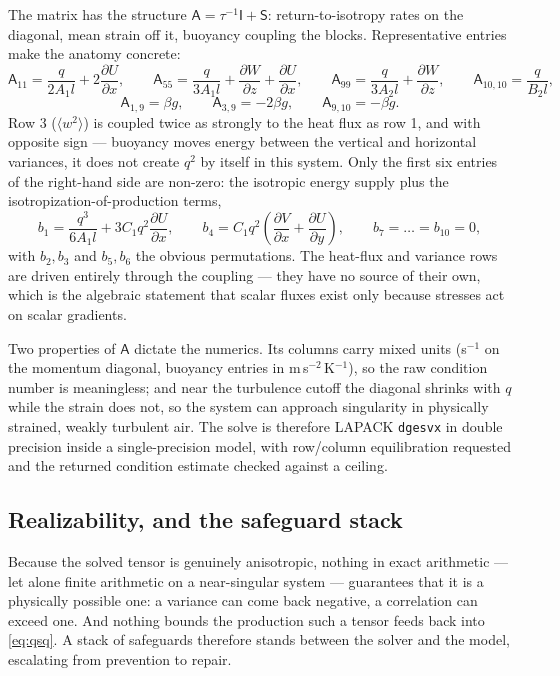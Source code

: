 \documentclass[10pt,a4paper]{article}
\newcommand{\avg}[1]{\langle #1 \rangle}
\newcommand{\pd}[2]{\frac{\partial #1}{\partial #2}}
\begin{document}
The matrix has the structure $\mathsf{A} = \tau^{-1}\mathsf{I} + \mathsf{S}$: return-to-isotropy rates on the diagonal, mean strain off it, buoyancy coupling the blocks. Representative entries make the anatomy concrete:
\begin{equation}
\mathsf{A}_{11} = \frac{q}{2A_1 l} + 2\pd{U}{x},
\qquad
\mathsf{A}_{55} = \frac{q}{3A_1 l} + \pd{W}{z} + \pd{U}{x},
\qquad
\mathsf{A}_{99} = \frac{q}{3A_2 l} + \pd{W}{z},
\qquad
\mathsf{A}_{10,10} = \frac{q}{B_2 l},
\end{equation}
\begin{equation}
\mathsf{A}_{1,9} = \beta g,
\qquad
\mathsf{A}_{3,9} = -2\beta g,
\qquad
\mathsf{A}_{9,10} = -\beta g .
\end{equation}
Row 3 ($\avg{w^2}$) is coupled twice as strongly to the heat flux as row 1, and with opposite sign — buoyancy moves energy between the vertical and horizontal variances, it does not create $q^2$ by itself in this system. Only the first six entries of the right-hand side are non-zero: the isotropic energy supply plus the isotropization-of-production terms,
\begin{equation}
b_{1} = \frac{q^3}{6 A_1 l} + 3 C_1 q^2 \pd{U}{x},
\qquad
b_{4} = C_1 q^2 \left( \pd{V}{x} + \pd{U}{y} \right),
\qquad
b_{7} = \dots = b_{10} = 0,
\end{equation}
with $b_2, b_3$ and $b_5, b_6$ the obvious permutations. The heat-flux and variance rows are driven entirely through the coupling — they have no source of their own, which is the algebraic statement that scalar fluxes exist only because stresses act on scalar gradients.

Two properties of $\mathsf{A}$ dictate the numerics. Its columns carry mixed units (s$^{-1}$ on the momentum diagonal, buoyancy entries in m\,s$^{-2}$\,K$^{-1}$), so the raw condition number is meaningless; and near the turbulence cutoff the diagonal shrinks with $q$ while the strain does not, so the system can approach singularity in physically strained, weakly turbulent air. The solve is therefore LAPACK \texttt{dgesvx} in double precision inside a single-precision model, with row/column equilibration requested and the returned condition estimate checked against a ceiling.

\subsection{Realizability, and the safeguard stack}

Because the solved tensor is genuinely anisotropic, nothing in exact arithmetic — let alone finite arithmetic on a near-singular system — guarantees that it is a physically possible one: a variance can come back negative, a correlation can exceed one. And nothing bounds the production such a tensor feeds back into \eqref{eq:qsq}. A stack of safeguards therefore stands between the solver and the model, escalating from prevention to repair.
\end{document}
